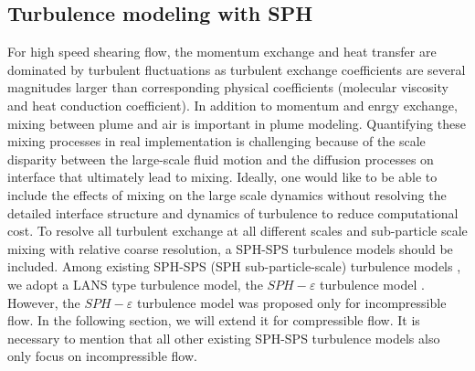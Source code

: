 \documentclass[gmd, manuscript]{copernicus}
\begin{document}

\subsection{Turbulence modeling with SPH}
For high speed shearing flow, the momentum exchange and heat transfer are dominated by turbulent fluctuations as turbulent exchange coefficients are several magnitudes larger than corresponding physical coefficients (molecular viscosity and heat conduction coefficient). In addition to momentum and enrgy exchange, mixing between plume and air is important in plume modeling. Quantifying these mixing processes in real implementation is challenging because of the scale disparity between the large-scale fluid motion and the diffusion processes on interface that ultimately lead to mixing. Ideally, one would like to be able to include the effects of mixing on the large scale dynamics without resolving the detailed interface structure and dynamics of turbulence to reduce computational cost.
To resolve all turbulent exchange at all different scales and sub-particle scale mixing with relative coarse resolution, a SPH-SPS turbulence models should be included. Among existing SPH-SPS (SPH sub-particle-scale) turbulence models \citep{holm1999fluctuation, monaghan2002sph, violeau2007numerical, monaghan2011turbulence}, we adopt a LANS type turbulence model, the $SPH-\varepsilon$ turbulence model \citep{monaghan2011turbulence}. However, the $SPH-\varepsilon$ turbulence model was proposed only for incompressible flow. In the following section, we will extend it for compressible flow. It is necessary to mention that all other existing SPH-SPS turbulence models \citep{holm1999fluctuation, monaghan2002sph, violeau2007numerical} also only focus on incompressible flow.

% 
\end{document}
